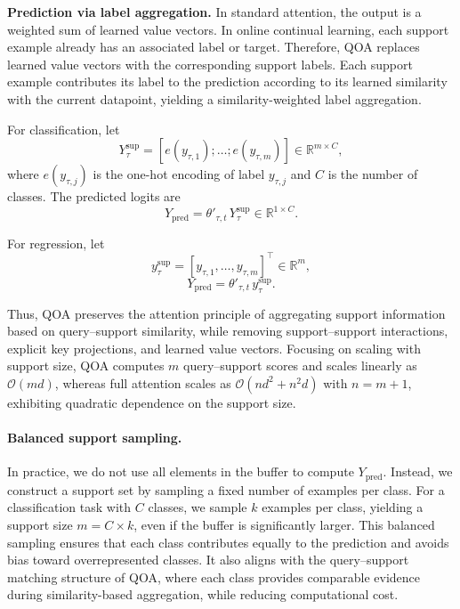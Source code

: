 \documentclass{article}
\begin{document}
\textbf{Prediction via label aggregation.}
In standard attention, the output is a weighted sum of learned value vectors. In online continual learning, each support example already has an associated label or target. Therefore, QOA replaces learned value vectors with the corresponding support labels. Each support example contributes its label to the prediction according to its learned similarity with the current datapoint, yielding a similarity-weighted label aggregation.

For classification, let
\[
Y_{\tau}^{\mathrm{sup}} = [e(y_{\tau,1}); \ldots; e(y_{\tau,m})] \in \mathbb{R}^{m\times C},
\]
where $e(y_{\tau,j})$ is the one-hot encoding of label $y_{\tau,j}$ and $C$ is the number of classes. The predicted logits are
\[
Y_{\mathrm{pred}} = \theta'_{\tau,t} \, Y_{\tau}^{\mathrm{sup}} \in \mathbb{R}^{1\times C}.
\]

For regression, let
\[
y_{\tau}^{\mathrm{sup}} = [y_{\tau,1}, \ldots, y_{\tau,m}]^\top \in \mathbb{R}^{m},
\]
\[
Y_{\mathrm{pred}} = \theta'_{\tau,t} \, y_{\tau}^{\mathrm{sup}}.
\]

Thus, QOA preserves the attention principle of aggregating support information based on query--support similarity, while removing support--support interactions, explicit key projections, and learned value vectors. Focusing on scaling with support size, QOA computes $m$ query--support scores and scales linearly as $\mathcal{O}(md)$, whereas full attention scales as $\mathcal{O}(nd^2 + n^2 d)$ with $n=m+1$, exhibiting quadratic dependence on the support size.


\paragraph{Balanced support sampling.}
In practice, we do not use all elements in the buffer to compute $Y_{\mathrm{pred}}$. Instead, we construct a support set by sampling a fixed number of examples per class. For a classification task with $C$ classes, we sample $k$ examples per class, yielding a support size $m = C \times k$, even if the buffer is significantly larger.
This balanced sampling ensures that each class contributes equally to the prediction and avoids bias toward overrepresented classes. It also aligns with the query--support matching structure of QOA, where each class provides comparable evidence during similarity-based aggregation, while reducing computational cost.
\end{document}
